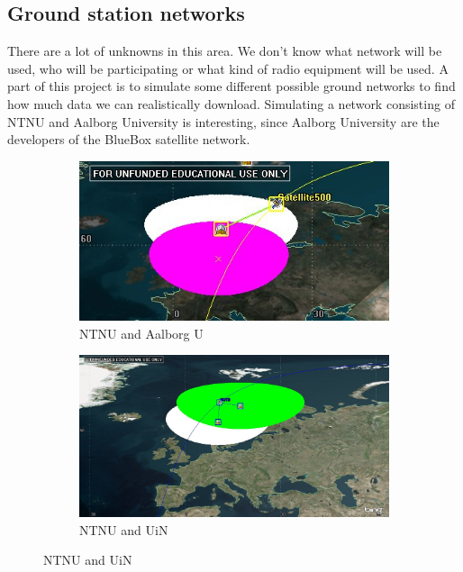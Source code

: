 \subsection{Ground station networks}

There are a lot of unknowns in this area. We don't know what network will be used, who will be participating or what kind of radio equipment will be used. A part of this project is to simulate some different possible ground networks to find how much data we can realistically download.  
Simulating a network consisting of NTNU and Aalborg University is interesting, since Aalborg University are the developers of the BlueBox satellite network. 

\begin{figure}
	\centering
	\begin{subfigure}{0.3\textwidth}
		\includegraphics[width=\textwidth]{Figures/range_ntnu_aalborg}
		\caption{NTNU and Aalborg U}
	\end{subfigure}
	\begin{subfigure}{0.3\textwidth}
		\includegraphics[width=\textwidth]{Figures/range_ntnu_narvik}
		\caption{NTNU and UiN}
	\end{subfigure}
\end{figure}


